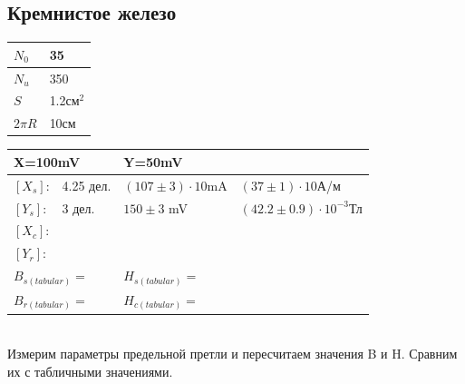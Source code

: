 \documentclass[12pt]{article}
\begin{document}
\subsection{Кремнистое железо}
\begin{minipage}{0.4\textwidth}
\begin{tabular}{|l|l|}
\hline
$N_0$ & 35        \\ \hline
$N_u$ & 350       \\ \hline
$S$   & 1.2см$^2$ \\ \hline
$2\pi R$ & 10см \\ \hline
\end{tabular}
\end{minipage}
\begin{minipage}{0.5\textwidth}
\begin{tabular}{|l|l|l|l|}
\hline
\multicolumn{2}{|l|}{X=100mV} & \multicolumn{2}{l|}{Y=50mV} \\ \hline
$[X_s]$:    & 4.25 дел.    & $(107  \pm 3)\cdot 10 $mA      &    $(37 \pm 1)\cdot 10$А/м  \\ \hline
$[Y_s]$:    & 3 дел.    & $150 \pm 3$ mV        &   $(42.2 \pm 0.9)\cdot10^{-3}$Тл   \\ \hline
$[X_c]$:    &              &                      &      \\ \hline
$[Y_r]$:    &              &                      &      \\ \hline
\multicolumn{2}{|l|}{$B_{s(tabular)} = $} & \multicolumn{2}{l|}{$H_{s(tabular)} = $} \\ \hline
\multicolumn{2}{|l|}{$B_{r(tabular)} = $} & \multicolumn{2}{l|}{$H_{c(tabular)} = $} \\ \hline
\end{tabular}
\end{minipage}\\

Измерим параметры предельной претли и пересчитаем значения B и H. Сравним их с табличными значениями.\\
\end{document}
